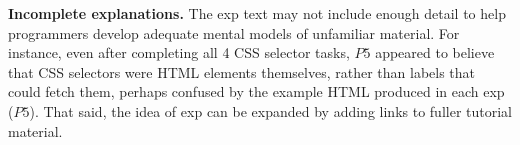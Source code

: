 {\bf Incomplete explanations.} The  \gls{exp} text may not include enough detail to help programmers  develop adequate mental models of unfamiliar material. For instance,
even after completing all 4 CSS selector tasks, $P5$ appeared to believe that CSS selectors were HTML elements themselves, rather than labels that could fetch them, perhaps confused by the example HTML produced in each \gls{exp} ($P5$).
That said, the idea of \gls{exp} can be expanded by adding links to fuller tutorial material.
